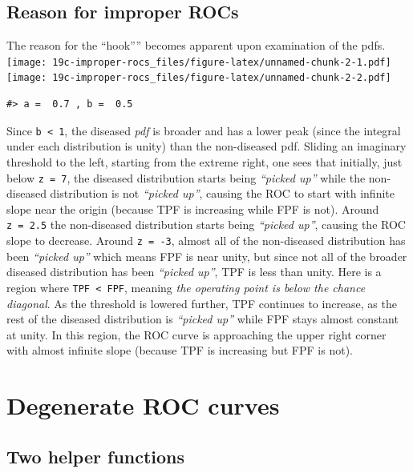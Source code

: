 \documentclass[
]{book}
\begin{document}
\hypertarget{reason-for-improper-rocs}{%
\section{Reason for improper ROCs}\label{reason-for-improper-rocs}}

The reason for the ``hook'''' becomes apparent upon examination of the pdfs.
\texttt{[image: 19c-improper-rocs\_files/figure-latex/unnamed-chunk-2-1.pdf]} \texttt{[image: 19c-improper-rocs\_files/figure-latex/unnamed-chunk-2-2.pdf]}

\begin{verbatim}
#> a =  0.7 , b =  0.5
\end{verbatim}

Since \texttt{b\ \textless{}\ 1}, the diseased \emph{pdf} is broader and has a lower peak (since the integral under each distribution is unity) than the non-diseased pdf. Sliding an imaginary threshold to the left, starting from the extreme right, one sees that initially, just below \texttt{z\ =\ 7}, the diseased distribution starts being \emph{``picked up''} while the non-diseased distribution is not \emph{``picked up''}, causing the ROC to start with infinite slope near the origin (because TPF is increasing while FPF is not). Around \texttt{z\ =\ 2.5} the non-diseased distribution starts being \emph{``picked up''}, causing the ROC slope to decrease. Around \texttt{z\ =\ -3}, almost all of the non-diseased distribution has been \emph{``picked up''} which means FPF is near unity, but since not all of the broader diseased distribution has been \emph{``picked up''}, TPF is less than unity. Here is a region where \texttt{TPF\ \textless{}\ FPF}, meaning \emph{the operating point is below the chance diagonal}. As the threshold is lowered further, TPF continues to increase, as the rest of the diseased distribution is \emph{``picked up''} while FPF stays almost constant at unity. In this region, the ROC curve is approaching the upper right corner with almost infinite slope (because TPF is increasing but FPF is not).

\hypertarget{degenerate-rocs}{%
\chapter{Degenerate ROC curves}\label{degenerate-rocs}}

\hypertarget{two-helper-functions}{%
\section{Two helper functions}\label{two-helper-functions}}
\end{document}
